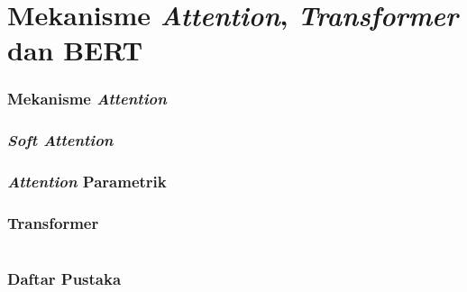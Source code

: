 \documentclass{beamer}
\newcommand{\f}[1]{\textit{#1}}
\begin{document}
\section{Mekanisme \f{Attention}, \f{Transformer} dan BERT}

\begin{frame}
    \frametitle{Mekanisme \f{Attention}}
\end{frame}

\begin{frame}
    \frametitle{\f{Soft Attention}}
\end{frame}

\begin{frame}
    \frametitle{\f{Attention} Parametrik}
\end{frame}

\begin{frame}
    \frametitle{Transformer}
\end{frame}

\section{}

\begin{frame}
    
\end{frame}


\begin{frame}[allowframebreaks]
    \frametitle{Daftar Pustaka}
    
\end{frame}
\end{document}
